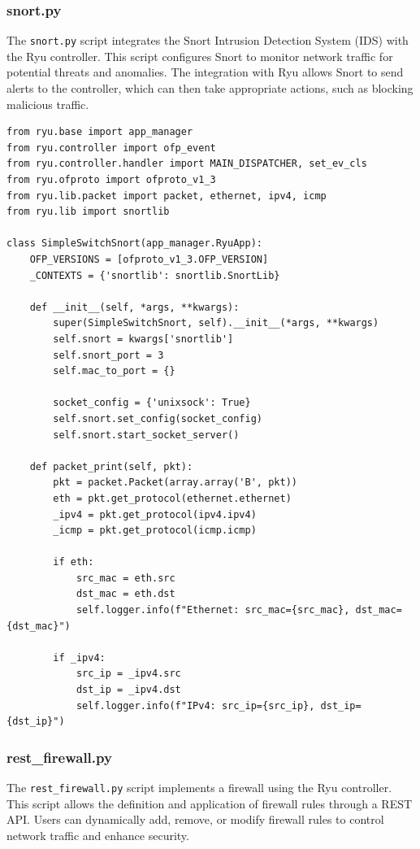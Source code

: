 \documentclass[a4paper,12pt]{article}
\begin{document}
\subsubsection{snort.py}
The \texttt{snort.py} script integrates the Snort Intrusion Detection System (IDS) with the Ryu controller. This script configures Snort to monitor network traffic for potential threats and anomalies. The integration with Ryu allows Snort to send alerts to the controller, which can then take appropriate actions, such as blocking malicious traffic.

\begin{verbatim}
from ryu.base import app_manager
from ryu.controller import ofp_event
from ryu.controller.handler import MAIN_DISPATCHER, set_ev_cls
from ryu.ofproto import ofproto_v1_3
from ryu.lib.packet import packet, ethernet, ipv4, icmp
from ryu.lib import snortlib

class SimpleSwitchSnort(app_manager.RyuApp):
    OFP_VERSIONS = [ofproto_v1_3.OFP_VERSION]
    _CONTEXTS = {'snortlib': snortlib.SnortLib}

    def __init__(self, *args, **kwargs):
        super(SimpleSwitchSnort, self).__init__(*args, **kwargs)
        self.snort = kwargs['snortlib']
        self.snort_port = 3
        self.mac_to_port = {}

        socket_config = {'unixsock': True}
        self.snort.set_config(socket_config)
        self.snort.start_socket_server()

    def packet_print(self, pkt):
        pkt = packet.Packet(array.array('B', pkt))
        eth = pkt.get_protocol(ethernet.ethernet)
        _ipv4 = pkt.get_protocol(ipv4.ipv4)
        _icmp = pkt.get_protocol(icmp.icmp)

        if eth:
            src_mac = eth.src
            dst_mac = eth.dst
            self.logger.info(f"Ethernet: src_mac={src_mac}, dst_mac={dst_mac}")

        if _ipv4:
            src_ip = _ipv4.src
            dst_ip = _ipv4.dst
            self.logger.info(f"IPv4: src_ip={src_ip}, dst_ip={dst_ip}")
\end{verbatim}

\subsubsection{rest\_firewall.py}
The \texttt{rest\_firewall.py} script implements a firewall using the Ryu controller. This script allows the definition and application of firewall rules through a REST API. Users can dynamically add, remove, or modify firewall rules to control network traffic and enhance security.
\end{document}
